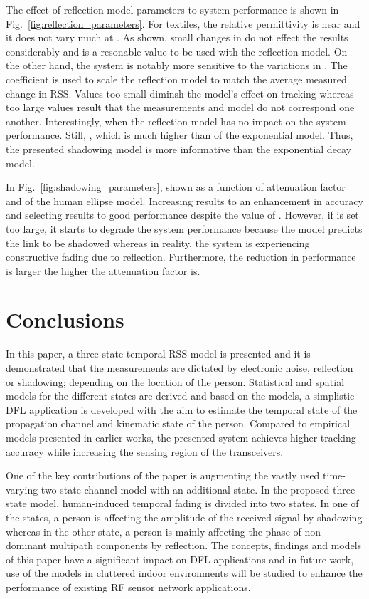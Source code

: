 \documentclass[journal, 10pt, twocolumn, balance]{IEEEtran}
\begin{document}
The effect of reflection model parameters to system performance is shown in Fig.~\ref{fig:reflection_parameters}. For textiles, the relative permittivity is near  and it does not vary much at  \cite{Sankaralingam2010}. As shown, small changes in  do not effect the results considerably and  is a resonable value to be used with the reflection model. On the other hand, the system is notably more sensitive to the variations in . The coefficient is used to scale the reflection model to match the average measured change in RSS. Values too small diminsh the model's effect on tracking whereas too large values result that the measurements and model do not correspond one another. Interestingly, when  the reflection model has no impact on the system performance. Still, , which is much higher than  of the exponential model. Thus, the presented shadowing model is more informative than the exponential decay model.

In Fig.~\ref{fig:shadowing_parameters},  shown as a function of attenuation factor  and  of the human ellipse model. Increasing  results to an enhancement in accuracy and selecting  results to good performance despite the value of . However, if  is set too large, it starts to degrade the system performance because the model predicts the link to be shadowed whereas in reality, the system is experiencing constructive fading due to reflection. Furthermore, the reduction in performance is larger the higher the attenuation factor is.





\section{Conclusions} \label{S:conlcusions}
In this paper, a three-state temporal RSS model is presented and it is demonstrated that the measurements are dictated by electronic noise, reflection or shadowing; depending on the location of the person. Statistical and spatial models for the different states are derived and based on the models, a simplistic DFL application is developed with the aim to estimate the temporal state of the propagation channel and kinematic state of the person. Compared to empirical models presented in earlier works, the presented system achieves higher tracking accuracy while increasing the sensing region of the transceivers.

One of the key contributions of the paper is augmenting the vastly used time-varying two-state channel model with an additional state. In the proposed three-state model, human-induced temporal fading is divided into two states. In one of the states, a person is affecting the amplitude of the received signal by shadowing whereas in the other state, a person is mainly affecting the phase of non-dominant multipath components by reflection. The concepts, findings and models of this paper have a significant impact on DFL applications and in future work, use of the models in cluttered indoor environments will be studied to enhance the performance of existing RF sensor network applications.
\end{document}
